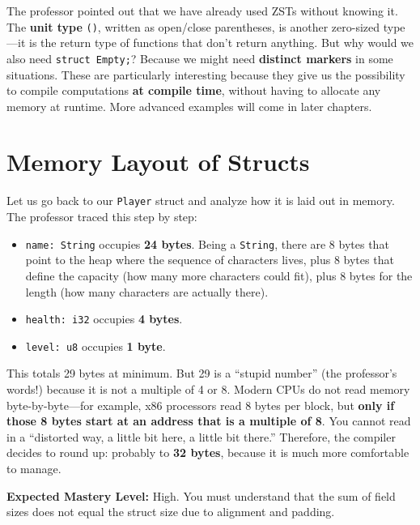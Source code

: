 \begin{insightbox}
The professor pointed out that we have already used ZSTs without knowing it. The \textbf{unit type} \texttt{()}, written as open/close parentheses, is another zero-sized type---it is the return type of functions that don't return anything. But why would we also need \texttt{struct Empty;}? Because we might need \textbf{distinct markers} in some situations. These are particularly interesting because they give us the possibility to compile computations \textbf{at compile time}, without having to allocate any memory at runtime. More advanced examples will come in later chapters.
\end{insightbox}

\section{Memory Layout of Structs}

\begin{examprioritybox}
Let us go back to our \texttt{Player} struct and analyze how it is laid out in memory. The professor traced this step by step:

\begin{itemize}
    \item \texttt{name: String} occupies \textbf{24 bytes}. Being a \texttt{String}, there are 8 bytes that point to the heap where the sequence of characters lives, plus 8 bytes that define the capacity (how many more characters could fit), plus 8 bytes for the length (how many characters are actually there).
    \item \texttt{health: i32} occupies \textbf{4 bytes}.
    \item \texttt{level: u8} occupies \textbf{1 byte}.
\end{itemize}

This totals 29 bytes at minimum. But 29 is a ``stupid number'' (the professor's words!) because it is not a multiple of 4 or 8. Modern CPUs do not read memory byte-by-byte---for example, x86 processors read 8 bytes per block, but \textbf{only if those 8 bytes start at an address that is a multiple of 8}. You cannot read in a ``distorted way, a little bit here, a little bit there.'' Therefore, the compiler decides to round up: probably to \textbf{32 bytes}, because it is much more comfortable to manage.

\textbf{Expected Mastery Level:} High. You must understand that the sum of field sizes does not equal the struct size due to alignment and padding.
\end{examprioritybox}

